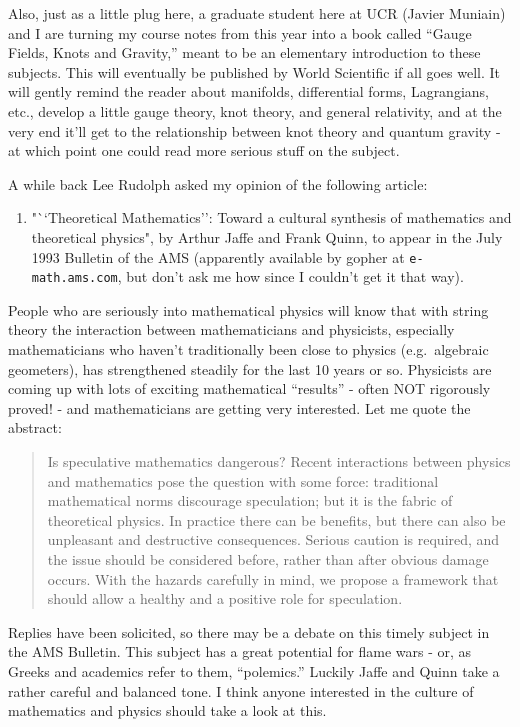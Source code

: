 \documentclass{article}
\def\tightlist{}
\begin{document}
Also, just as a little plug here, a graduate student here at UCR (Javier
Muniain) and I are turning my course notes from this year into a book
called ``Gauge Fields, Knots and Gravity,'' meant to be an elementary
introduction to these subjects. This will eventually be published by
World Scientific if all goes well. It will gently remind the reader
about manifolds, differential forms, Lagrangians, etc., develop a little
gauge theory, knot theory, and general relativity, and at the very end
it'll get to the relationship between knot theory and quantum gravity -
at which point one could read more serious stuff on the subject.

A while back Lee Rudolph asked my opinion of the following article:

\begin{enumerate}
\def\labelenumi{\arabic{enumi})}
\tightlist
\item
  "``Theoretical Mathematics'': Toward a cultural synthesis of
  mathematics and theoretical physics", by Arthur Jaffe and Frank Quinn,
  to appear in the July 1993 Bulletin of the AMS (apparently available
  by gopher at \texttt{e-math.ams.com}, but don't ask me how since I
  couldn't get it that way).
\end{enumerate}

People who are seriously into mathematical physics will know that with
string theory the interaction between mathematicians and physicists,
especially mathematicians who haven't traditionally been close to
physics (e.g.~algebraic geometers), has strengthened steadily for the
last 10 years or so. Physicists are coming up with lots of exciting
mathematical ``results'' - often NOT rigorously proved! - and
mathematicians are getting very interested. Let me quote the abstract:

\begin{quote}
Is speculative mathematics dangerous? Recent interactions between
physics and mathematics pose the question with some force: traditional
mathematical norms discourage speculation; but it is the fabric of
theoretical physics. In practice there can be benefits, but there can
also be unpleasant and destructive consequences. Serious caution is
required, and the issue should be considered before, rather than after
obvious damage occurs. With the hazards carefully in mind, we propose a
framework that should allow a healthy and a positive role for
speculation.
\end{quote}

Replies have been solicited, so there may be a debate on this timely
subject in the AMS Bulletin. This subject has a great potential for
flame wars - or, as Greeks and academics refer to them, ``polemics.''
Luckily Jaffe and Quinn take a rather careful and balanced tone. I think
anyone interested in the culture of mathematics and physics should take
a look at this.
\end{document}

